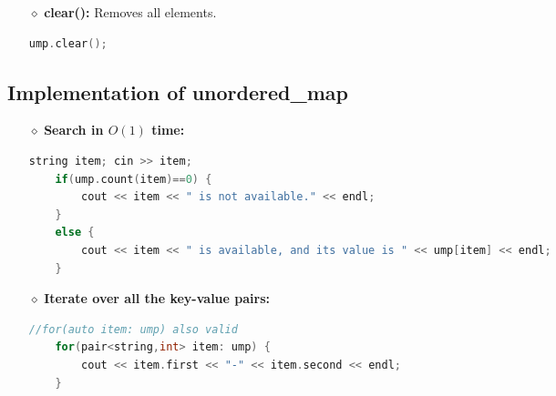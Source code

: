 \begin{itemize}
	\item[{\LARGE $\diamond$}] \textbf{clear():} Removes all elements.
	\begin{lstlisting}[language=C++]
	ump.clear();
	\end{lstlisting}
	
\end{itemize}


\newpage
\subsection{Implementation of unordered\_map}
\begin{itemize}
	\item[{\LARGE $\diamond$}] \textbf{Search in $O(1)$ time:}
	\begin{lstlisting}[language=C++]
	string item; cin >> item;
	if(ump.count(item)==0) {
		cout << item << " is not available." << endl;
	}
	else {
		cout << item << " is available, and its value is " << ump[item] << endl;
	}	
	\end{lstlisting}
	
	\item[{\LARGE $\diamond$}] \textbf{Iterate over all the key-value pairs:}
	\begin{lstlisting}[language=C++]
	//for(auto item: ump) also valid
	for(pair<string,int> item: ump) {
		cout << item.first << "-" << item.second << endl;
	} 
	\end{lstlisting}
\end{itemize}







